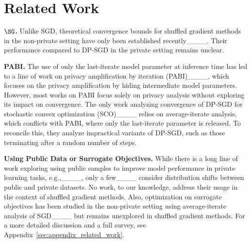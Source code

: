 \section{Related Work}
\label{subsec:related_work}


\textbf{$\SG$.} Unlike SGD, theoretical convergence bounds for shuffled gradient methods in the non-private setting have only been established recently____. Their performance compared to DP-SGD in the private setting remains unclear. 

\textbf{PABI.} The use of only the last-iterate model parameter at inference time has led to a line of work on privacy amplification by iteration (PABI)____, which focuses on the privacy amplification by hiding intermediate model parameters. However, most works on PABI focus solely on privacy analysis without exploring its impact on convergence.
The only work analyzing convergence of DP-SGD for stochastic convex optimization (SCO)____ relies on average-iterate analysis, which conflicts with PABI, where only the last-iterate parameter is released. To reconcile this, they analyze impractical variants of DP-SGD, such as those terminating after a random number of steps. 

\textbf{Using Public Data or Surrogate Objectives.} While there is a long line of work exploring using public samples to improve model performance in private learning tasks, e.g.,____, only a few____ consider distribution shifts between public and private datasets. No work, to our knowledge, address their usage in the context of shuffled gradient methods.
Also, optimization on surrogate objectives has been studied in the non-private setting using average-iterate analysis of SGD____ but remains unexplored in shuffled gradient methods.
For a more detailed discussion and a full survey, see Appendix~\ref{sec:appendix_related_work}.